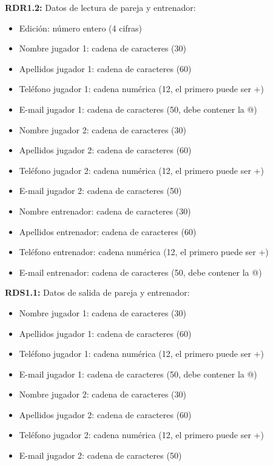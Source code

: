 \textbf{RDR1.2:} Datos de lectura de pareja y entrenador:
\begin{itemize}
	\item Edición: número entero (4 cifras)
\newline
	\item Nombre jugador 1: cadena de caracteres (30)
	\item Apellidos jugador 1: cadena de caracteres (60)
	\item Teléfono jugador 1: cadena numérica (12, el primero puede ser +)
	\item E-mail jugador 1: cadena de caracteres (50, debe contener la @)
\newline
	\item Nombre jugador 2: cadena de caracteres (30)
	\item Apellidos jugador 2: cadena de caracteres (60)
	\item Teléfono jugador 2: cadena numérica (12, el primero puede ser  +)
	\item E-mail jugador 2: cadena de caracteres (50)
\newline
	\item Nombre entrenador: cadena de caracteres (30)
	\item Apellidos entrenador: cadena de caracteres (60)
	\item Teléfono entrenador: cadena numérica (12, el primero puede ser  +)
	\item E-mail entrenador: cadena de caracteres (50, debe contener la @)
\end{itemize}

\textbf{RDS1.1:} Datos de salida de pareja y entrenador:
\begin{itemize}
	\item Nombre jugador 1: cadena de caracteres (30)
	\item Apellidos jugador 1: cadena de caracteres (60)
	\item Teléfono jugador 1: cadena numérica (12, el primero puede ser +)
	\item E-mail jugador 1: cadena de caracteres (50, debe contener la @)
\newline
	\item Nombre jugador 2: cadena de caracteres (30)
	\item Apellidos jugador 2: cadena de caracteres (60)
	\item Teléfono jugador 2: cadena numérica (12, el primero puede ser  +)
	\item E-mail jugador 2: cadena de caracteres (50)
\end{itemize}

